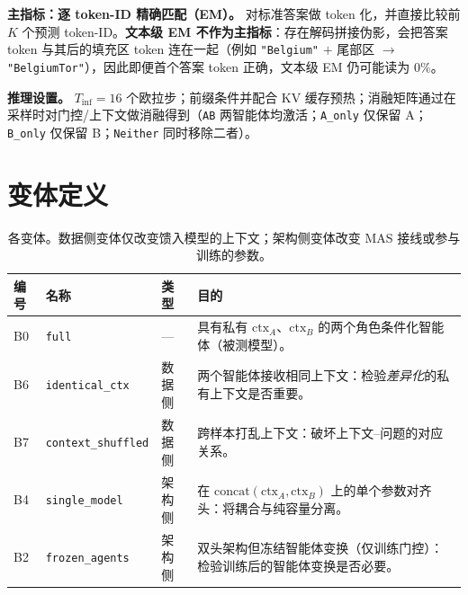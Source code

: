 \documentclass[10pt]{article}
\newcommand{\ctxa}{$\text{ctx}_A$}
\newcommand{\ctxb}{$\text{ctx}_B$}
\begin{document}
\noindent\textbf{主指标：逐 token-ID 精确匹配（EM）。} 对标准答案做 token 化，并直接比较前 $K$ 个预测 token-ID。\textbf{文本级 EM 不作为主指标}：存在解码拼接伪影，会把答案 token 与其后的填充区 token 连在一起（例如 \texttt{"Belgium"} $+$ 尾部区 $\rightarrow$ \texttt{"BelgiumTor"}），因此即便首个答案 token 正确，文本级 EM 仍可能读为 $0\%$。

\noindent\textbf{推理设置。} $T_{\text{inf}}{=}16$ 个欧拉步；前缀条件并配合 KV 缓存预热；消融矩阵通过在采样时对门控/上下文做消融得到（\texttt{AB} 两智能体均激活；\texttt{A\_only} 仅保留 A；\texttt{B\_only} 仅保留 B；\texttt{Neither} 同时移除二者）。

\section{变体定义}
\begin{table}[H]
\centering
\small
\begin{tabular}{@{}l l l p{7.0cm}@{}}
\toprule
\textbf{编号} & \textbf{名称} & \textbf{类型} & \textbf{目的} \\
\midrule
B0 & \texttt{full}             & ---               & 具有私有 \ctxa{}、\ctxb{} 的两个角色条件化智能体（被测模型）。 \\
B6 & \texttt{identical\_ctx}   & 数据侧            & 两个智能体接收相同上下文：检验\emph{差异化}的私有上下文是否重要。 \\
B7 & \texttt{context\_shuffled}& 数据侧            & 跨样本打乱上下文：破坏上下文--问题的对应关系。 \\
B4 & \texttt{single\_model}    & 架构侧            & 在 $\text{concat}(\text{ctx}_A,\text{ctx}_B)$ 上的单个参数对齐头：将耦合与纯容量分离。 \\
B2 & \texttt{frozen\_agents}   & 架构侧            & 双头架构但冻结智能体变换（仅训练门控）：检验训练后的智能体变换是否必要。 \\
\bottomrule
\end{tabular}
\caption{各变体。数据侧变体仅改变馈入模型的上下文；架构侧变体改变 MAS 接线或参与训练的参数。}
\end{table}
\end{document}
